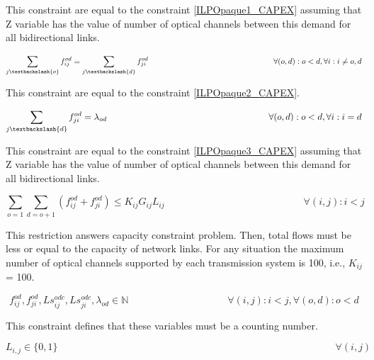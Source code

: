 This constraint are equal to the constraint \ref{ILPOpaque1_CAPEX} assuming that Z variable has the value of number of optical channels between this demand for all bidirectional links.

\begin{equation}
\sum_{j\textbackslash \{o\}} f_{ij}^{od} = \sum_{j\textbackslash \{d\}} f_{ji}^{od} \qquad \qquad \qquad \qquad \qquad \qquad \qquad \qquad
\forall(o,d) : o < d, \forall i: i \neq o,d
\label{ILPTransluc7}
\end{equation}

This constraint are equal to the constraint \ref{ILPOpaque2_CAPEX}.

\begin{equation}
\sum_{j\textbackslash \{d\}} f_{ji}^{od} = \lambda_{od}  \qquad \qquad \qquad \qquad \qquad \qquad \qquad \qquad \qquad
\forall(o,d) : o < d, \forall i: i = d
\label{ILPTransluc8}
\end{equation}

This constraint are equal to the constraint \ref{ILPOpaque3_CAPEX} assuming that Z variable has the value of number of optical channels between this demand for all bidirectional links.

\begin{equation}
\sum_{o=1} \sum_{d=o+1} \left( f_{ij}^{od} + f_{ji}^{od}\right) \leq K_{ij} G_{ij} L_{ij} \qquad \qquad \qquad \qquad \qquad \qquad \qquad
\forall (i,j) : i < j
\label{ILPTransluc9}
\end{equation}

This restriction answers capacity constraint problem. Then, total flows must be less or equal to the capacity of network links. For any situation the maximum number of optical channels supported by each transmission system is 100, i.e., $K_{ij}$ = 100.

\begin{equation}
f_{ij}^{od} , f_{ji}^{od} , Ls_{ij}^{odc} , Ls_{ji}^{odc} , \lambda_{od} \in \mathbb{N}   \qquad \qquad \qquad \qquad \qquad
\forall(i,j) : i < j, \forall(o,d) : o < d
\label{ILPTransluc10}
\end{equation}

This constraint defines that these variables must be a counting number.

\begin{equation}
L_{i,j} \in \{0,1\} \qquad \qquad \qquad \qquad \qquad \qquad \qquad \qquad \qquad \qquad \qquad \qquad \qquad \qquad
\forall(i,j)
\label{ILPTransluc11}
\end{equation}

